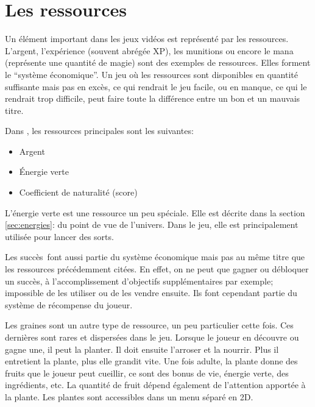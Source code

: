 \section{Les ressources}
Un élément important dans les jeux vidéos est représenté par les ressources. L'argent, l'expérience (souvent abrégée XP), les munitions ou encore le mana (représente une quantité de magie) sont des exemples de ressources. Elles forment le \enquote{système économique}. Un jeu où les ressources sont disponibles en quantité suffisante mais pas en excès, ce qui rendrait le jeu facile, ou en manque, ce qui le rendrait trop difficile, peut faire toute la différence entre un bon et un mauvais titre.\cite{LevelUpTheGuidetoGreatVideoGameDesign_Rogers}

Dans \nomJeu, les ressources principales sont les suivantes:
\begin{itemize}
	\item Argent
	\item Énergie verte
	\item Coefficient de naturalité (score)
\end{itemize}

L'énergie verte est une ressource un peu spéciale. Elle est décrite dans la section \ref{sec:energies}:  du point de vue de l'univers. Dans le jeu, elle est principalement utilisée pour lancer des sorts.

Les succès\ font aussi partie du système économique mais pas au même titre que les ressources précédemment citées. En effet, on ne peut que gagner ou débloquer un succès, à l'accomplissement d'objectifs supplémentaires par exemple; impossible de les utiliser ou de les vendre ensuite. Ils font cependant partie du système de récompense du joueur.

Les graines sont un autre type de ressource, un peu particulier cette fois. Ces dernières sont rares et dispersées dans le jeu. Lorsque le joueur en découvre ou gagne une, il peut la planter. Il doit ensuite l'arroser et la nourrir. Plus il entretient la plante, plus elle grandit vite. Une fois adulte, la plante donne des fruits que le joueur peut cueillir, ce sont des bonus de vie, énergie verte, des ingrédients, etc. La quantité de fruit dépend également de l'attention apportée à la plante. Les plantes sont accessibles dans un menu séparé en 2D.


